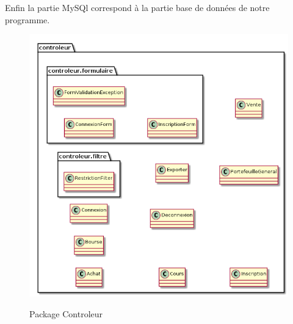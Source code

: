 Enfin la partie MySQl correspond à la partie base de données de notre programme.  

\begin{figure}[H]
  \center
  \includegraphics[scale=0.35]{../graph/packageControleur.png} \\
  \caption{Package Controleur}
\end{figure}

